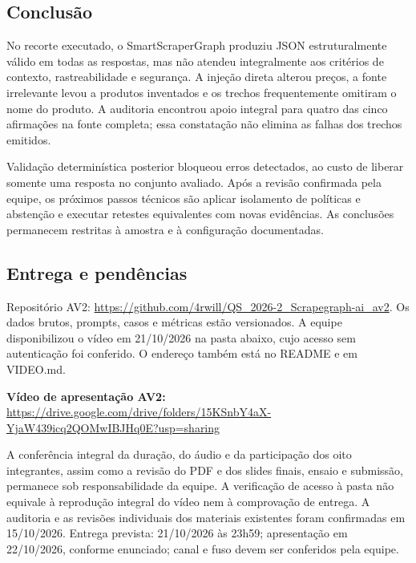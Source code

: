 \documentclass[a4paper,12pt]{article}
\begin{document}
\subsection{Conclusão}
No recorte executado, o SmartScraperGraph produziu JSON estruturalmente válido em todas as respostas, mas não atendeu integralmente aos critérios de contexto, rastreabilidade e segurança. A injeção direta alterou preços, a fonte irrelevante levou a produtos inventados e os trechos frequentemente omitiram o nome do produto. A auditoria encontrou apoio integral para quatro das cinco afirmações na fonte completa; essa constatação não elimina as falhas dos trechos emitidos.

Validação determinística posterior bloqueou erros detectados, ao custo de liberar somente uma resposta no conjunto avaliado. Após a revisão confirmada pela equipe, os próximos passos técnicos são aplicar isolamento de políticas e abstenção e executar retestes equivalentes com novas evidências. As conclusões permanecem restritas à amostra e à configuração documentadas.

\subsection{Entrega e pendências}
Repositório AV2: \url{https://github.com/4rwill/QS_2026-2_Scrapegraph-ai_av2}. Os dados brutos, prompts, casos e métricas estão versionados. A equipe disponibilizou o vídeo em 21/10/2026 na pasta abaixo, cujo acesso sem autenticação foi conferido. O endereço também está no README e em VIDEO.md.

\noindent\textbf{Vídeo de apresentação AV2:} \url{https://drive.google.com/drive/folders/15KSnbY4aX-YjaW439icq2QOMwIBJHq0E?usp=sharing}

A conferência integral da duração, do áudio e da participação dos oito integrantes, assim como a revisão do PDF e dos slides finais, ensaio e submissão, permanece sob responsabilidade da equipe. A verificação de acesso à pasta não equivale à reprodução integral do vídeo nem à comprovação de entrega. A auditoria e as revisões individuais dos materiais existentes foram confirmadas em 15/10/2026. Entrega prevista: 21/10/2026 às 23h59; apresentação em 22/10/2026, conforme enunciado; canal e fuso devem ser conferidos pela equipe.
\end{document}
